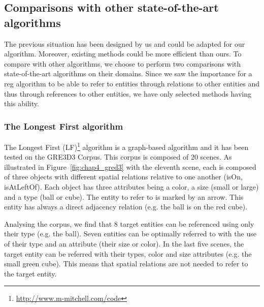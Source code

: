 \subsection{Comparisons with other state-of-the-art algorithms}

The previous situation has been designed by us and could be adapted for our algorithm. Moreover, existing methods could be more efficient than ours. To compare with other algorithms, we choose to perform two comparisons with state-of-the-art algorithms on their domains. Since we saw the importance for a \acrshort{reg} algorithm to be able to refer to entities through relations to other entities and thus through references to other entities, we have only selected methods having this ability.

\subsubsection{The Longest First algorithm}

The Longest First (LF)\footnote{\url{http://www.m-mitchell.com/code}} algorithm \cite{viethen_2013_graphs} is a graph-based algorithm and it has been tested on the GRE3D3 Corpus. This corpus is composed of 20 scenes. As illustrated in Figure~\ref{fig:chap4_gred3} with the eleventh scene, each is composed of three objects with different spatial relations relative to one another (isOn, isAtLeftOf). Each object has three attributes being a color, a size (small or large) and a type (ball or cube). The entity to refer to is marked by an arrow. This entity has always a direct adjacency relation (e.g. the ball is on the red cube).

Analysing the corpus, we find that 8 target entities can be referenced using only their type (e.g. the ball). Seven entities can be optimally referred to with the use of their type and an attribute (their size or color). In the last five scenes, the target entity can be referred with their types, color and size attributes (e.g. the small green cube). This means that spatial relations are not needed to refer to the target entity. 

